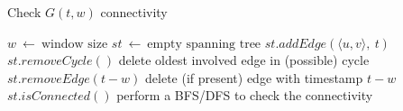 \newpage
\setcounter{algorithm}{0}
\begin{algorithm}
	\caption{Check $G(t,w)$ connectivity}
	\begin{algorithmic}[1]
		\State $w \ \leftarrow \ \text{window size}$
		\State $st \ \leftarrow \ \text{empty spanning tree}$
			\State $st.addEdge(\langle u, v \rangle, \ t)$
			\State $st.removeCycle()$ \Comment delete oldest involved edge in (possible) cycle
            \State $st.removeEdge(t-w)$ \Comment delete (if present) edge with timestamp $t-w$
			\State \Return $st.isConnected()$  \Comment perform a BFS/DFS to check the connectivity
		\EndEvent
	\end{algorithmic}
\end{algorithm}
